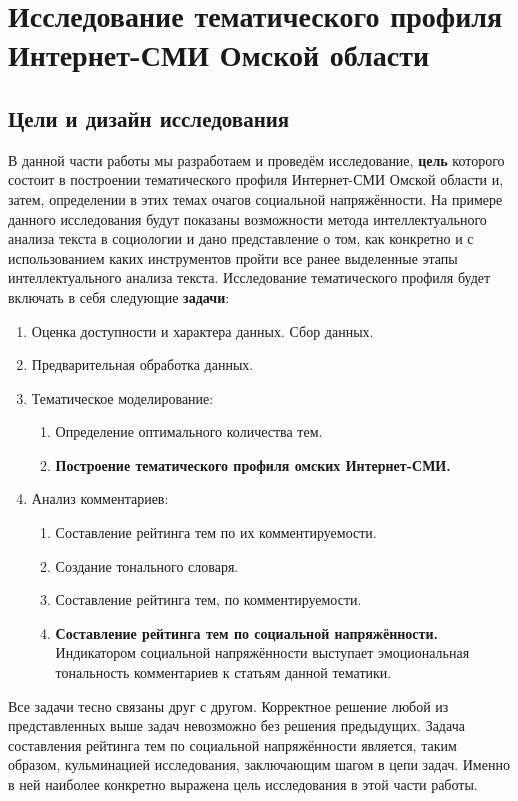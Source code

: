 \chapter{Исследование тематического профиля Интернет-СМИ Омской области} \label{chapt2}
\section{Цели и дизайн исследования}
В данной части работы мы разработаем и проведём исследование, \textbf{цель} которого состоит в построении тематического профиля Интернет-СМИ Омской области и, затем, определении в этих темах очагов социальной напряжённости. На примере данного исследования будут показаны возможности метода интеллектуального анализа текста в социологии и дано представление о том, как конкретно и с использованием каких инструментов пройти все ранее выделенные этапы интеллектуального анализа текста. Исследование тематического профиля будет включать в себя следующие \textbf{задачи}:

\begin{enumerate}
\item Оценка доступности и характера данных. Сбор данных.
\item Предварительная обработка данных.
\item Тематическое моделирование:
	\begin{enumerate}
	\item Определение оптимального количества тем.
	\item \textbf{Построение тематического профиля омских Интернет-СМИ.}
	\end{enumerate}
\item Анализ комментариев:
	\begin{enumerate}
	\item Составление рейтинга тем по их комментируемости.
	\item Создание тонального словаря.
	\item Составление рейтинга тем, по комментируемости.
	\item \textbf{Составление рейтинга тем по социальной напряжённости.} Индикатором социальной напряжённости выступает эмоциональная тональность комментариев к статьям данной тематики.
	\end{enumerate}

\end{enumerate}

Все задачи тесно связаны друг с другом. Корректное решение любой из представленных выше задач невозможно без решения предыдущих. Задача составления рейтинга тем по социальной напряжённости является, таким образом, кульминацией исследования, заключающим шагом в цепи задач. Именно в ней наиболее конкретно выражена цель исследования в этой части работы.

